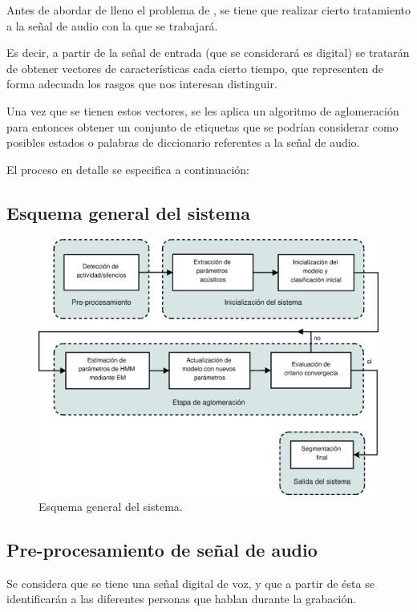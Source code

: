 Antes de abordar de lleno el problema de \sd, se tiene que realizar cierto tratamiento a la señal de audio con la que se trabajará. 

Es decir, a partir de la señal de entrada (que se considerará es digital) se tratarán de obtener vectores de características cada cierto tiempo, que representen de forma adecuada los rasgos que nos interesan distinguir.

Una vez que se tienen estos vectores, se les aplica un algoritmo de aglomeración para entonces obtener un conjunto de etiquetas que se podrían considerar como posibles estados o palabras de diccionario referentes a la señal de audio.

El proceso en detalle se especifica a continuación: 
\subsection{Esquema general del sistema}

\begin{figure}[ht]
  \centerline
  {\includegraphics[width=1.4\linewidth]{gfx/chap2/ASR_flow}} \quad
  \caption{Esquema general del sistema.}
  \label{fig:esquema}
\end{figure}

\subsection{Pre-procesamiento de señal de audio}

Se considera que se tiene una señal digital de voz, y que a partir de ésta se identificarán a las diferentes personas que hablan durante la grabación.


